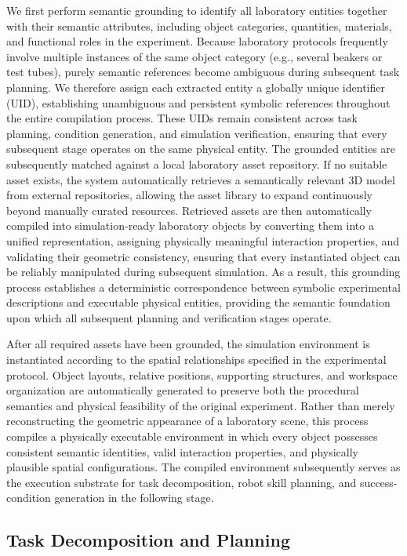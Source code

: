 \documentclass[sigconf]{acmart}
\begin{document}
We first perform semantic grounding to identify all laboratory entities together with their semantic attributes, including object categories, quantities, materials, and functional roles in the experiment. Because laboratory protocols frequently involve multiple instances of the same object category (e.g., several beakers or test tubes), purely semantic references become ambiguous during subsequent task planning. We therefore assign each extracted entity a globally unique identifier (UID), establishing unambiguous and persistent symbolic references throughout the entire compilation process. These UIDs remain consistent across task planning, condition generation, and simulation verification, ensuring that every subsequent stage operates on the same physical entity. The grounded entities are subsequently matched against a local laboratory asset repository. If no suitable asset exists, the system automatically retrieves a semantically relevant 3D model from external repositories, allowing the asset library to expand continuously beyond manually curated resources. Retrieved assets are then automatically compiled into simulation-ready laboratory objects by converting them into a unified representation, assigning physically meaningful interaction properties, and validating their geometric consistency, ensuring that every instantiated object can be reliably manipulated during subsequent simulation. As a result, this grounding process establishes a deterministic correspondence between symbolic experimental descriptions and executable physical entities, providing the semantic foundation upon which all subsequent planning and verification stages operate.

After all required assets have been grounded, the simulation environment is instantiated according to the spatial relationships specified in the experimental protocol. Object layouts, relative positions, supporting structures, and workspace organization are automatically generated to preserve both the procedural semantics and physical feasibility of the original experiment. Rather than merely reconstructing the geometric appearance of a laboratory scene, this process compiles a physically executable environment in which every object possesses consistent semantic identities, valid interaction properties, and physically plausible spatial configurations. The compiled environment subsequently serves as the execution substrate for task decomposition, robot skill planning, and success-condition generation in the following stage.

\subsection{Task Decomposition and Planning}
\end{document}
